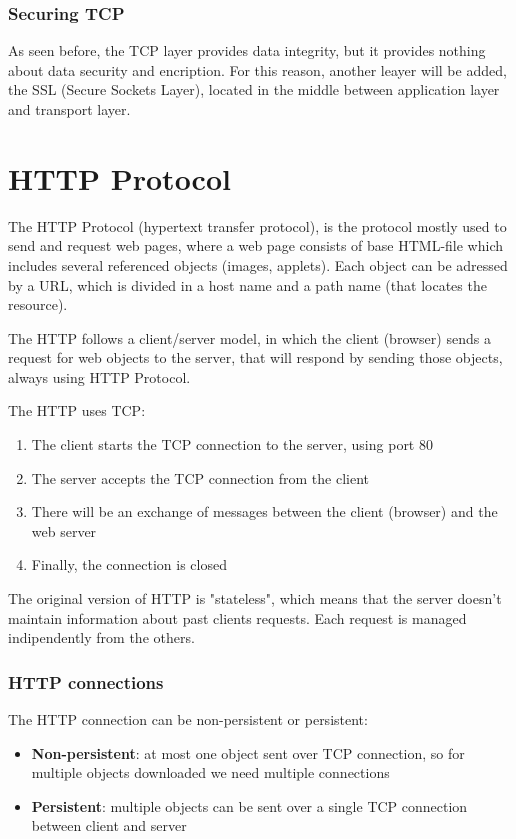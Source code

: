 \subsubsection{Securing TCP}
As seen before, the TCP layer provides data integrity, but it provides nothing about data security and encription. For this reason, another leayer will be added, the SSL (Secure Sockets Layer), located in the middle between application layer and transport layer.

\section{HTTP Protocol}
The HTTP Protocol (hypertext transfer protocol), is the protocol mostly used to send and request web pages, where a web page consists of base HTML-file which includes several referenced objects (images, applets). Each object can be adressed by a URL, which is divided in a host name and a path name (that locates the resource).

The HTTP follows a client/server model, in which the client (browser) sends a request for web objects to the server, that will respond by sending those objects, always using HTTP Protocol.

\noindent The HTTP uses TCP:
\begin{enumerate}
    \item The client starts the TCP connection to the server, using port 80
    \item The server accepts the TCP connection from the client
    \item There will be an exchange of messages between the client (browser) and the web server
    \item Finally, the connection is closed
\end{enumerate}

\noindent The original version of HTTP is "stateless", which means that the server doesn't maintain information about past clients requests. Each request is managed indipendently from the others.

\subsubsection{HTTP connections}
The HTTP connection can be non-persistent or persistent:
\begin{itemize}
    \item \textbf{Non-persistent}: at most one object sent over TCP connection, so for multiple objects downloaded we need multiple connections
    \item \textbf{Persistent}: multiple objects can be sent over a single TCP connection between client and server
\end{itemize}

